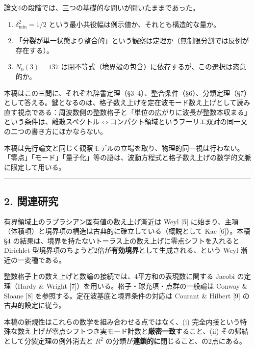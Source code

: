 \documentclass[
]{ltjsarticle}
\providecommand{\tightlist}{%
  \setlength{\itemsep}{0pt}\setlength{\parskip}{0pt}}
\begin{document}
論文4の段階では、三つの基礎的な問いが開いたままであった。

\begin{enumerate}
\def\labelenumi{\arabic{enumi}.}
\tightlist
\item
  \(\delta_{\min}^2=1/2\)
  という最小共役幅は例示値か、それとも構造的な量か。
\item
  「分裂が単一状態より整合的」という観察は定理か（無制限分割では反例が存在する）。
\item
  \(N_0(3)=137\)
  は閉不等式（境界殻の包含）に依存するが、この選択は恣意的か。
\end{enumerate}

本稿はこの三問に、それぞれ辞書定理（§3--4）、整合条件（§6）、分類定理（§7）として答える。鍵となるのは、格子数え上げを定在波モード数え上げとして読み直す視点である：周波数側の整数格子と「単位の広がりに波長が整数本収まる」という条件は、離散スペクトル\(\Longleftrightarrow\)コンパクト領域というフーリエ双対の同一文の二つの書き方にほかならない。

本稿は先行論文と同じく観察モデルの立場を取り、物理的同一視は行わない。「零点」「モード」「量子化」等の語は、波動方程式と格子数え上げの数学的文脈に限定して用いる。

\begin{center}\rule{0.5\linewidth}{0.5pt}\end{center}

\subsection{2. 関連研究}\label{ux95a2ux9023ux7814ux7a76}

有界領域上のラプラシアン固有値の数え上げ漸近は Weyl {[}5{]}
に始まり、主項（体積項）と境界項の構造は古典的に確立している（概説として
Kac {[}6{]}）。本稿 §4
の結果は、境界を持たないトーラス上の数え上げに零点シフトを入れると
Dirichlet
型境界項のちょうど2倍が\textbf{有効境界}として生成される、という Weyl
漸近の一変種である。

整数格子上の数え上げと数論の接続では、4平方和の表現数に関する Jacobi
の定理（Hardy \& Wright {[}7{]}）を用いる。格子・球充填・点群の一般論は
Conway \& Sloane {[}8{]} を参照する。定在波基底と境界条件の対応は
Courant \& Hilbert {[}9{]} の古典的設定に従う。

本稿の新規性はこれらの数学を組み合わせる点ではなく、(i)
完全内接という特殊な数え上げが零点シフトつき実モード計数と\textbf{厳密一致}すること、(ii)
その帰結として分裂定理の例外消去と \(R^2\)
の分類が\textbf{連鎖的に}閉じること、の2点にある。
\end{document}
